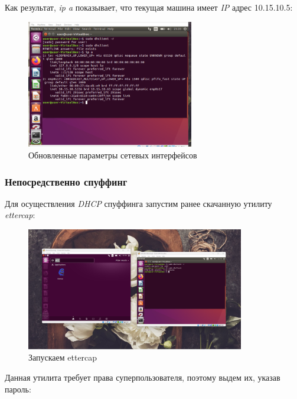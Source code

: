 \documentclass[a4paper]{article}
\begin{document}
  Как результат, \textit{ip a} показывает, что текущая машина имеет \textit{IP} адрес
  10.15.10.5:

  \begin{figure}[H]
    \centering
    \includegraphics[width=0.65\textwidth]{02_00 (20_1)}
    \caption{Обновленные параметры сетевых интерфейсов}
    \label{img:0018}
  \end{figure}

  \subsubsection{Непосредственно спуффинг}

  Для осуществления \textit{DHCP} спуффинга запустим ранее скачанную утилиту \textit{ettercap}:

  \begin{figure}[H]
    \centering
    \includegraphics[width=0.85\textwidth]{02_00 (23)}
    \caption{Запускаем ettercap}
    \label{img:0019}
  \end{figure}

  Данная утилита требует права суперпользователя, поэтому выдем их, указав пароль:
\end{document}
